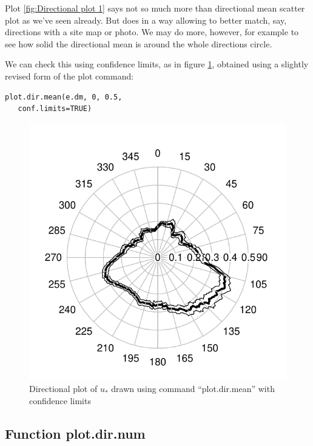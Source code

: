 \documentclass[a4paper,10pt]{book}
\begin{document}
Plot \ref{fig:Directional plot 1} says not so much more than directional mean scatter plot as we've seen already. But does in a way allowing to better match, say, directions with a site map or photo. We may do more, however, for example to see how solid the directional mean is around the whole directions circle.

We can check this using confidence limits, as in figure \ref{fig:Directional plot 2}, obtained using a slightly revised form of the plot command:

\begin{verbatim}
plot.dir.mean(e.dm, 0, 0.5,
   conf.limits=TRUE)
\end{verbatim}

\begin{figure}[htp]
 \centering
 \begin{center}
 \includegraphics[scale=1,keepaspectratio=true]{./diagrams/DirMeanUstar_2.pdf}
 \end{center}
 \caption{Directional plot of $u_{*}$ drawn using command ``plot.dir.mean'' with confidence limits}
 \label{fig:Directional plot 2}
\end{figure}


\subsection{Function plot.dir.num}
\end{document}
